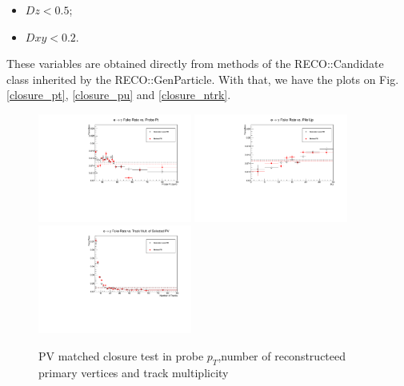 \begin{itemize}
\item $Dz < 0.5$;
\item $Dxy < 0.2$.
\end{itemize}

These variables are obtained directly from methods of the RECO::Candidate class inherited by the RECO::GenParticle.
With that, we have the plots on Fig. \ref{closure_pt}, \ref{closure_pu} and \ref{closure_ntrk}.

\begin{figure}[H]
\begin{center}
{\label{closure_pt}\includegraphics[width=0.45\textwidth]{efake_figs/closure_pt.pdf}}
{\label{closure_pu}\includegraphics[width=0.45\textwidth]{efake_figs/closure_pu.pdf}}
\\
{\label{closure_ntrk}\includegraphics[width=0.45\textwidth]{efake_figs/closure_trk.pdf}}
\caption{PV matched closure test in probe $p_T$,number of reconstructeed primary vertices and track multiplicity}
\label{closure_all}
\end{center}
\end{figure}


